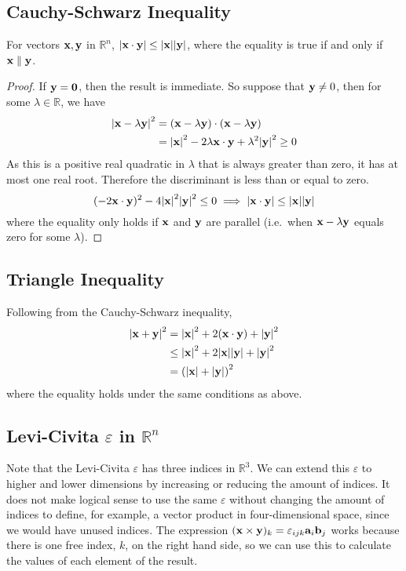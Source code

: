 \subsection{Cauchy-Schwarz Inequality}
\begin{proposition}
	For vectors \(\vb x, \vb y\) in \(\mathbb R^n\), \(\abs{\vb x \cdot \vb y} \leq \abs{\vb x} \abs{\vb y}\), where the equality is true if and only if \(\vb x \parallel \vb y\).
\end{proposition}
\begin{proof}
	If \(\vb y = \vb 0\), then the result is immediate. So suppose that \(\vb y \neq 0\), then for some \(\lambda \in \mathbb R\), we have
	\begin{align*}
		\abs{\vb x - \lambda \vb y}^2 & =
		(\vb x - \lambda \vb y) \cdot (\vb x - \lambda \vb y)                                                          \\
		                              & = \abs{\vb x}^2 - 2 \lambda \vb x \cdot \vb y + \lambda^2 \abs{\vb y}^2 \geq 0
	\end{align*}
	As this is a positive real quadratic in \(\lambda\) that is always greater than zero, it has at most one real root. Therefore the discriminant is less than or equal to zero.
	\[ (-2 \vb x \cdot \vb y)^2 - 4 \abs{\vb x}^2\abs{\vb y}^2 \leq 0
		\implies \abs{\vb x \cdot \vb y} \leq \abs{\vb x}\abs{\vb y} \]
	where the equality only holds if \(\vb x\) and \(\vb y\) are parallel (i.e.\ when \(\vb x - \lambda \vb y\) equals zero for some \(\lambda\)).
\end{proof}

\subsection{Triangle Inequality}
Following from the Cauchy-Schwarz inequality,
\begin{align*}
	\abs{\vb x + \vb y}^2
	 & = \abs{\vb x}^2 + 2(\vb x \cdot \vb y) + \abs{\vb y}^2        \\
	 & \leq \abs{\vb x}^2 + 2 \abs{\vb x}\abs{\vb y} + \abs{\vb y}^2 \\
	 & = \left(\abs{\vb x} + \abs{\vb y}\right)^2
\end{align*}
where the equality holds under the same conditions as above.

\subsection{Levi-Civita \(\varepsilon\) in \(\mathbb R^n\)}
Note that the Levi-Civita \(\varepsilon\) has three indices in \(\mathbb R^3\). We can extend this \(\varepsilon\) to higher and lower dimensions by increasing or reducing the amount of indices. It does not make logical sense to use the same \(\varepsilon\) without changing the amount of indices to define, for example, a vector product in four-dimensional space, since we would have unused indices. The expression \((\vb x \times \vb y)_k = \varepsilon_{ijk} \vb a_i \vb b_j\) works because there is one free index, \(k\), on the right hand side, so we can use this to calculate the values of each element of the result.

